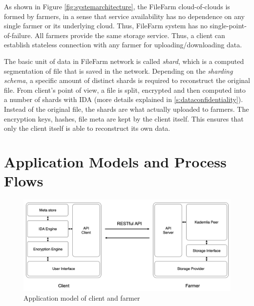 As shown in Figure \ref{fig:systemarchitecture}, the FileFarm cloud-of-clouds is formed by farmers, in a sense that service availability has no dependence on any single farmer or its underlying cloud. Thus, FileFarm system has no single-point-of-failure. All farmers provide the same storage service. Thus, a client can establish stateless connection with any farmer for uploading/downloading data.

The basic unit of data in FileFarm network is called \textit{shard}, which is a computed segmentation of file that is saved in the network. Depending on the \textit{sharding schema}, a specific amount of distinct shards is required to reconstruct the original file. From client's point of view, a file is split, encrypted and then computed into a number of shards with IDA (more details explained in \ref{s:dataconfidentiality}). Instead of the original file, the shards are what actually uploaded to farmers. The encryption keys, hashes, file meta are kept by the client itself. This ensures that only the client itself is able to reconstruct its own data.

\section{Application Models and Process Flows}
\label{s:applicationmodelsandprocessflows}

\begin{figure}[hbt]
\centering
  \includegraphics[width=14cm]{figures/application_models.png}
  \caption{Application model of client and farmer}
  \label{fig:applicationmodels}
\end{figure}

